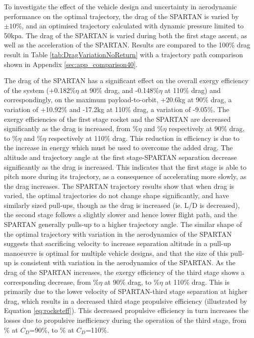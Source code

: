To investigate the effect of the vehicle design and uncertainty in aerodynamic performance on the optimal trajectory, the drag of the SPARTAN is varied by $\pm10$\%, and an optimised trajectory calculated with dynamic pressure limited to 50kpa. The drag of the SPARTAN is varied during both the first stage ascent, as well as the acceleration of the SPARTAN. Results are compared to the 100\% drag result in Table \ref{tab:DragVariationNoReturn} with a trajectory path comparison shown in Appendix \ref{sec:app_comparison40}. 

The drag of the SPARTAN has a significant effect on the overall exergy efficiency of the system (+0.182\%$\eta$ at 90\% drag, and -0.148\%$\eta$ at 110\% drag) and correspondingly, on the maximum payload-to-orbit, +20.6kg at 90\% drag, a variation of +10.92\% and -17.2kg at 110\% drag, a variation of -9.05\%. The exergy efficiencies of the first stage rocket and the SPARTAN are decreased significantly as the drag is increased, from \firstExergyEffCdNinetyNoReturn\%$\eta$ and \secondExergyEffCdNinetyNoReturn\%$\eta$ respectively at 90\% drag, to \firstExergyEffCdOneHundredTenNoReturn\%$\eta$ and \secondExergyEffCdOneHundredTenNoReturn\%$\eta$ respectively at 110\% drag. This reduction in efficiency is due to the increase in energy which must be used to overcome the added drag. 
The altitude and trajectory angle at the first stage-SPARTAN separation decrease significantly as the drag is increased. This indicates that the first stage is able to pitch more during its trajectory, as a consequence of accelerating more slowly, as the drag increases.
The SPARTAN trajectory results show that when drag is varied, the optimal trajectories do not change shape significantly, and have similarly sized pull-ups, though as the drag is increased (ie. L/D is decreased), the second stage follows a slightly slower and hence lower flight path, and the SPARTAN generally pulls-up to a higher trajectory angle. The similar shape of the optimal trajectory with variation in the aerodynamics of the SPARTAN suggests that sacrificing velocity to increase separation altitude in a pull-up manoeuvre is optimal for multiple vehicle designs, and that the size of this pull-up is consistent with variation in the aerodynamics of the SPARTAN.
As the drag of the SPARTAN increases, the exergy efficiency of the third stage shows a corresponding decrease, from \thirddExergyEffCdNinetyNoReturn\%$\eta$ at 90\% drag, to \thirddExergyEffCdOneHundredTenNoReturn\%$\eta$ at 110\% drag.
This is primarily due to the lower velocity of SPARTAN-third stage separation at higher drag, which results in a decreased third stage propulsive efficiency (illustrated by Equation \ref{eq:rocketeff}). This decreased propulsive efficiency in turn increases the losses due to propulsive inefficiency during the operation of the third stage, from \PlossthreeCombinedCdNinetyNoReturn\% at $C_D$=90\%, to \PlossthreeCombinedCdOneHundredTenNoReturn\% at $C_D$=110\%.


